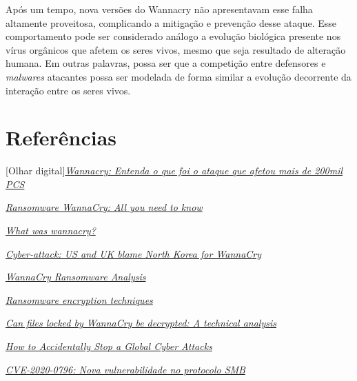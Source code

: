 \documentclass[12pt]{article}
\begin{document}
Após um tempo, nova versões do Wannacry não apresentavam esse falha altamente proveitosa, complicando a mitigação e prevenção desse ataque. Esse comportamento pode ser considerado análogo a evolução biológica presente nos vírus orgânicos que afetem os seres vivos, mesmo que seja resultado de alteração humana. Em outras palavras, possa ser que a competição entre defensores e \textit{malwares} atacantes possa ser modelada de forma similar a evolução decorrente da interação entre os seres vivos.

\bigskip

\bigskip

\bigskip

\noindent

\section{Referências}

[Olhar digital]\href{https://olhardigital.com.br/especial/wannacry/}{\textit{Wannacry: Entenda o que foi o ataque que afetou mais de 200mil PCS}}

\bigskip
\noindent
[Kaspersky]\href{https://www.kaspersky.com/resource-center/threats/ransomware-wannacry}{\textit{Ransomware WannaCry: All you need to know}}

\bigskip
\noindent
[Malwareytes]\href{https://www.malwarebytes.com/wannacry}{\textit{What was wannacry?}}

\bigskip
\noindent
[BBC]\href{https://www.bbc.com/news/world-us-canada-42407488}{\textit{Cyber-attack: US and UK blame North Korea for WannaCry}}

\bigskip
\noindent
[SecureWorks]\href{https://www.secureworks.com/research/wcry-ransomware-analysis}{\textit{WannaCry Ransomware Analysis}}

\bigskip
\noindent
[Medium]\href{https://medium.com/@tarcisioma/ransomware-encryption-techniques-696531d07bb9}{\textit{Ransomware encryption techniques}}

\bigskip
\noindent
[Medium]\href{https://medium.com/threat-intel/wannacry-ransomware-decryption-821c7e3f0a2b}{\textit{Can files locked by WannaCry be decrypted: A technical analysis}}

\bigskip
\noindent
[Malwaretech]\href{https://www.malwaretech.com/2017/05/how-to-accidentally-stop-a-global-cyber-attacks.html}{\textit{How to Accidentally Stop a Global Cyber Attacks}}

\bigskip
\noindent
[Kaspersky]\href{https://www.kaspersky.com.br/blog/smb-311-vulnerability/14532/}{\textit{CVE-2020-0796: Nova vulnerabilidade no protocolo SMB}}
\end{document}
